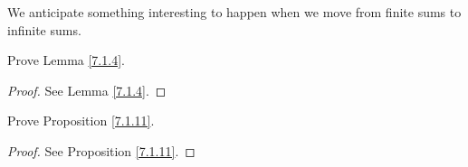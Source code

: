 \begin{remark}\label{7.1.15}
We anticipate something interesting to happen when we move from finite sums to infinite sums.
\end{remark}

\exercisesection

\begin{exercise}\label{ex 7.1.1}
Prove Lemma \ref{7.1.4}.
\end{exercise}

\begin{proof}
See Lemma \ref{7.1.4}.
\end{proof}

\begin{exercise}\label{ex 7.1.2}
Prove Proposition \ref{7.1.11}.
\end{exercise}

\begin{proof}
See Proposition \ref{7.1.11}.
\end{proof}